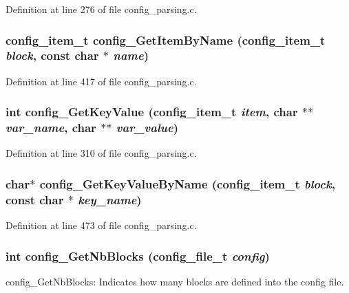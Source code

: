 Definition at line 276 of file config\_\-parsing.c.
\subsubsection[{config\_\-GetItemByName}]{\setlength{\rightskip}{0pt plus 5cm}config\_\-item\_\-t config\_\-GetItemByName (config\_\-item\_\-t {\em block}, \/  const char $\ast$ {\em name})}\label{config__parsing_8c_adac5bbcc24cd2a61cc5b5490b2db24f9}


Definition at line 417 of file config\_\-parsing.c.
\subsubsection[{config\_\-GetKeyValue}]{\setlength{\rightskip}{0pt plus 5cm}int config\_\-GetKeyValue (config\_\-item\_\-t {\em item}, \/  char $\ast$$\ast$ {\em var\_\-name}, \/  char $\ast$$\ast$ {\em var\_\-value})}\label{config__parsing_8c_aff2105a8be08ca4687d93ae8f1db2fde}


Definition at line 310 of file config\_\-parsing.c.
\subsubsection[{config\_\-GetKeyValueByName}]{\setlength{\rightskip}{0pt plus 5cm}char$\ast$ config\_\-GetKeyValueByName (config\_\-item\_\-t {\em block}, \/  const char $\ast$ {\em key\_\-name})}\label{config__parsing_8c_ad6f35ab17c0c80a1a63d1f495db136fd}


Definition at line 473 of file config\_\-parsing.c.
\subsubsection[{config\_\-GetNbBlocks}]{\setlength{\rightskip}{0pt plus 5cm}int config\_\-GetNbBlocks (config\_\-file\_\-t {\em config})}\label{config__parsing_8c_a1ad32491496feb6301ee1f4e8d9b72a0}
config\_\-GetNbBlocks: Indicates how many blocks are defined into the config file. 


